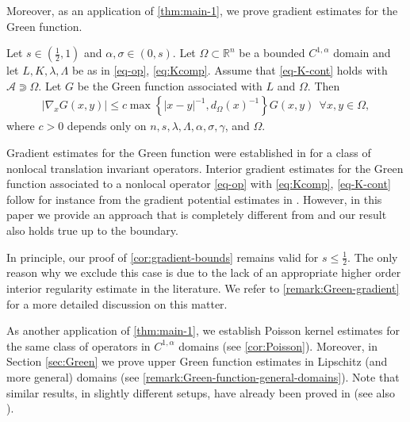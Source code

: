 \documentclass[11pt,reqno]{amsart}
\theoremstyle{plain}
\theoremstyle{definition}
\numberwithin{equation}{section}
\newcommand{\R}{\mathbb{R}}
\newcommand{\1}{\mathbbm{1}}
\begin{document}
Moreover, as an application of \autoref{thm:main-1}, we prove gradient estimates for the Green function.

\begin{corollary}
\label{cor:gradient-bounds}
Let $s \in (\frac{1}{2},1)$ and $\alpha,\sigma \in (0,s)$. Let $\Omega \subset \R^n$ be a bounded $C^{1,\alpha}$ domain and let $L,K, \lambda, \Lambda$ be as in \eqref{eq-op}, \eqref{eq:Kcomp}. Assume that \eqref{eq-K-cont} holds with $\mathcal{A} \Supset \Omega$. Let $G$ be the Green function associated with $L$ and $\Omega$. Then
\begin{align*}
|\nabla_x G(x,y)| 
\le c \max\left\{ |x-y|^{-1} , d_{\Omega}(x)^{-1} \right\} G(x,y)  ~~ \forall x,y \in \Omega,
\end{align*}
where $c > 0$ depends only on $n,s,\lambda,\Lambda,\alpha,\sigma,\gamma$, and $\Omega$.
\end{corollary}

Gradient estimates for the Green function were established in \cite{ BKN02,KuRy16,GJZ22} for a class of nonlocal translation invariant operators. Interior gradient estimates for the Green function associated to a nonlocal operator \eqref{eq-op} with \eqref{eq:Kcomp}, \eqref{eq-K-cont} follow for instance from the gradient potential estimates in \cite{KNS22}. However, in this paper we provide an approach that is completely different from \cite{KNS22} and our result also holds true up to the boundary.

\begin{remark}
    In principle, our proof of \autoref{cor:gradient-bounds} remains valid for $s \le \frac{1}{2}$. The only reason why we exclude this case is due to the lack of an appropriate higher order interior regularity estimate in the literature. We refer to \autoref{remark:Green-gradient} for a more detailed discussion on this matter.
\end{remark}

As another application of \autoref{thm:main-1}, we establish Poisson kernel estimates for the same class of operators in $C^{1,\alpha}$ domains (see \autoref{cor:Poisson}). Moreover, in Section \ref{sec:Green} we prove upper Green function estimates in Lipschitz (and more general) domains (see \autoref{remark:Green-function-general-domains}). Note that similar results, in slightly different setups, have already been proved in \cite{Bog00,Jak02} (see also \cite{BGR10,ABR25}).
\end{document}
